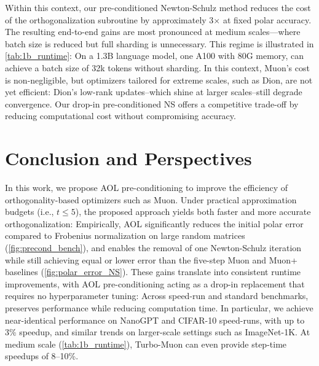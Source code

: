 Within this context, our pre-conditioned Newton-Schulz method reduces the cost of the orthogonalization subroutine by approximately 3× at fixed polar accuracy. The resulting end-to-end gains are most pronounced at medium scales—where batch size is reduced but full sharding is unnecessary. This regime is illustrated in \cref{tab:1b_runtime}: On a 1.3B language model, one A100 with 80G memory, can achieve a batch size of 32k tokens without sharding. In this context, Muon’s cost is non-negligible, but optimizers tailored for extreme scales, such as Dion\cite{ahn_dion_2025}, are not yet efficient: Dion's low-rank updates--which shine at larger scales--still degrade convergence. Our drop-in pre-conditioned NS offers a competitive trade-off by reducing computational cost without compromising accuracy.
\fi

\section{Conclusion and Perspectives}

In this work, we propose AOL pre-conditioning 
to improve 
the efficiency of orthogonality-based optimizers such as Muon.
Under practical approximation budgets (i.e., $t \leq 5$), 
the proposed approach yields both faster and more accurate orthogonalization: Empirically, AOL significantly reduces the initial polar error compared to Frobenius normalization on large random matrices (\cref{fig:precond_bench}), and enables the removal of one Newton-Schulz iteration while still achieving equal or lower error than the five-step Muon and Muon+ baselines (\cref{fig:polar_error_NS}). 
These gains translate into consistent runtime improvements, with AOL pre-conditioning acting as a drop-in replacement that requires no hyperparameter tuning:  Across speed-run and standard benchmarks, \turbomuon preserves performance while reducing computation time. In particular, 
we achieve near-identical performance on NanoGPT and CIFAR-10 speed-runs, 
with up to 3\% speedup,
and similar trends on larger-scale settings such as ImageNet-1K.
At medium scale (\cref{tab:1b_runtime}), Turbo-Muon can even provide step-time speedups of 8–10\%.

